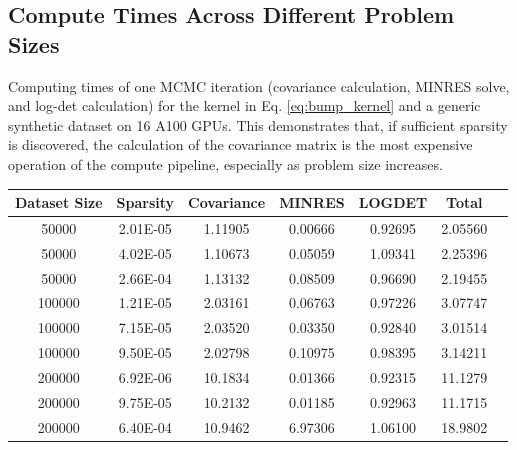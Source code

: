 \documentclass{article}
\begin{document}
\subsection{Compute Times Across Different Problem Sizes}\label{A:comp_times}
Computing times of one MCMC iteration (covariance calculation, MINRES solve, and log-det calculation) for the kernel in Eq. \eqref{eq:bump_kernel}
and a generic synthetic dataset on 16 A100 GPUs. This demonstrates that, if sufficient sparsity is discovered, the calculation of the covariance matrix is the most expensive operation of the compute pipeline, especially as problem size increases. 
\begin{table}[h!]
\centering
\scriptsize
\begin{tabular}{ccccccc}
\toprule
Dataset Size & Sparsity & Covariance & MINRES & LOGDET & Total \\
\midrule
50000 & 2.01E-05  & 1.11905 & 0.00666 & 0.92695 & 2.05560 \\
\midrule
50000 & 4.02E-05  & 1.10673 & 0.05059 & 1.09341 & 2.25396 \\
\midrule
50000 & 2.66E-04  & 1.13132 & 0.08509 & 0.96690 & 2.19455 \\
\midrule
100000 & 1.21E-05 & 2.03161 & 0.06763 & 0.97226 & 3.07747 \\
\midrule
100000 & 7.15E-05 & 2.03520 & 0.03350 & 0.92840 & 3.01514 \\
\midrule
100000 & 9.50E-05 & 2.02798 & 0.10975 & 0.98395 & 3.14211 \\
\midrule
200000 & 6.92E-06 & 10.1834 & 0.01366 & 0.92315 & 11.1279 \\
\midrule
200000 & 9.75E-05 & 10.2132 & 0.01185 & 0.92963 & 11.1715 \\
\midrule
200000 & 6.40E-04 & 10.9462 & 6.97306 & 1.06100 & 18.9802 \\
\bottomrule
\end{tabular}
\end{table}
\end{document}
